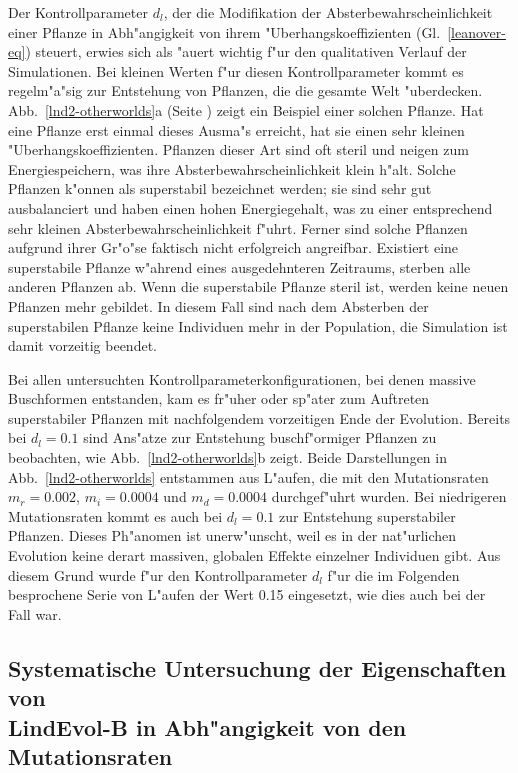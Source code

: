\begin{sloppypar}
Der Kontrollparameter $d_l$, der die Modifikation der Absterbewahrscheinlichkeit einer Pflanze in Abh"angigkeit von
ihrem "Uberhangskoeffizienten (Gl.\ \ref{leanover-eq}) steuert, erwies sich als "auert
wichtig f"ur den qualitativen
Verlauf der Simulationen. Bei kleinen Werten f"ur diesen Kontrollparameter kommt es regelm"a"sig zur Entstehung
von Pflanzen, die die gesamte Welt "uberdecken. Abb.\ \ref{lnd2-otherworlds}a (Seite \pageref{lnd2-otherworlds}) 
zeigt ein Beispiel einer solchen
Pflanze. Hat eine Pflanze erst einmal dieses Ausma"s erreicht, hat sie einen sehr kleinen "Uberhangskoeffizienten.
Pflanzen dieser Art sind oft steril und neigen zum Energiespeichern, was ihre Absterbewahrscheinlichkeit klein h"alt.
Solche Pflanzen k"onnen als superstabil bezeichnet werden; sie sind sehr gut ausbalanciert und haben einen hohen
Energiegehalt, was zu einer entsprechend sehr kleinen Absterbewahrscheinlichkeit f"uhrt. Ferner sind solche Pflanzen
aufgrund ihrer Gr"o"se faktisch nicht erfolgreich angreifbar. Existiert eine superstabile Pflanze w"ahrend eines ausgedehnteren
Zeitraums, sterben alle anderen Pflanzen ab. Wenn die superstabile Pflanze steril ist, werden keine neuen Pflanzen
mehr gebildet. In diesem Fall sind nach dem Absterben der superstabilen Pflanze keine Individuen mehr in der Population,
die Simulation ist damit vorzeitig beendet.
\end{sloppypar}

Bei allen untersuchten Kontrollparameterkonfigurationen, bei denen massive Buschformen entstanden, kam es fr"uher
oder sp"ater zum Auftreten superstabiler Pflanzen mit nachfolgendem vorzeitigen Ende der Evolution. Bereits bei
$d_l=0.1$ sind Ans"atze zur Entstehung buschf"ormiger Pflanzen zu beobachten, wie Abb.\ \ref{lnd2-otherworlds}b
zeigt. Beide Darstellungen in Abb.\ \ref{lnd2-otherworlds} entstammen aus L"aufen, die mit den Mutationsraten $m_r=0.002$, $m_i=0.0004$
und $m_d=0.0004$ durchgef"uhrt wurden. Bei niedrigeren Mutationsraten kommt es auch bei $d_l=0.1$ zur Entstehung
superstabiler Pflanzen. Dieses Ph"anomen ist unerw"unscht, weil es in der nat"urlichen Evolution keine derart massiven, globalen
Effekte einzelner Individuen gibt. Aus diesem Grund wurde f"ur den Kontrollparameter $d_l$ f"ur die im Folgenden
besprochene Serie von L"aufen der Wert 0.15 eingesetzt, wie dies auch bei  der Fall war.


\subsection{Systematische Untersuchung der Eigenschaften von \\
LindEvol-B in Abh"angigkeit von den Mutationsraten}

